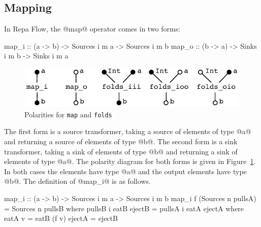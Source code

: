\subsection{Mapping}
In Repa Flow, the @map@ operator comes in two forms:
\begin{code}
map_i :: (a -> b) -> Sources i m a -> Sources i m b
map_o :: (b -> a) -> Sinks   i m b -> Sinks   i m a
\end{code}

\begin{figure}
\begin{center}
\includegraphics[scale=0.8]{figures/maps.pdf}
\end{center}
\vspace{-0.5em}
\caption{Polarities for \texttt{map} and \texttt{folds}}
\label{f:Map}
\end{figure}

The first form is a source transformer, taking a source of elements of type @a@ and returning a source of elements of type @b@. The second form is a sink transformer, taking a sink of elements of type @b@ and returning a sink of elements of type @a@. The polarity diagram for both forms is given in Figure~\ref{f:Map}. In both cases the elements have type @a@ and the output elements have type @b@. The definition of @map_i@ is as follows. 
\begin{code}
map_i :: (a -> b) -> Sources i m a -> Sources i m b
map_i f (Sources n pullsA)
 = Sources n pullsB
 where  pullsB i eatB ejectB
         = pullsA i eatA ejectA
         where  eatA v = eatB (f v)
                ejectA = ejectB
\end{code}


